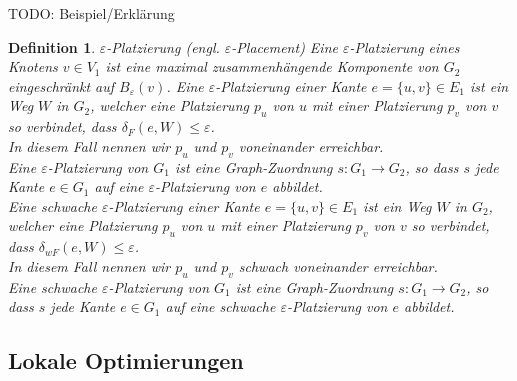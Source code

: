 \documentclass[a4paper, 12pt, twoside]{article}
\theoremstyle{Format1} %
\newtheorem{Def}{Definition}[section]       %
\begin{document}
TODO: Beispiel/Erklärung

\begin{Def}
	$\varepsilon$-Platzierung (engl. $\varepsilon$-Placement)
	Eine \textit{$\varepsilon$-Platzierung eines Knotens $v \in V_1$} ist eine maximal zusammenhängende Komponente von $G_2$ eingeschränkt auf $B_{\varepsilon}(v)$.
	Eine \textit{$\varepsilon$-Platzierung einer Kante $e = \{u,v\} \in E_1$} ist ein Weg $W$ in $G_2$, welcher eine Platzierung $p_u$ von $u$ mit einer Platzierung $p_v$ von $v$
	so verbindet, dass $\delta_F(e, W) \leq \varepsilon$.
	\\
	In diesem Fall nennen wir $p_u$ und $p_v$ \textit{voneinander erreichbar}.
	\\
	Eine \textit{$\varepsilon$-Platzierung von $G_1$} ist eine Graph-Zuordnung $s: G_1 \to G_2$, so dass $s$ jede Kante $e \in G_1$ auf eine $\varepsilon$-Platzierung von $e$ abbildet.
	\\
	Eine schwache $\varepsilon$-Platzierung einer Kante $e = \{u,v\} \in E_1$ ist ein Weg $W$ in $G_2$, welcher eine Platzierung $p_u$ von $u$ mit einer Platzierung $p_v$ von $v$
	so verbindet, dass $\delta_{wF}(e, W) \leq \varepsilon$.
	\\
	In diesem Fall nennen wir $p_u$ und $p_v$ \textit{schwach voneinander erreichbar}.
	\\
	Eine schwache \textit{$\varepsilon$-Platzierung von $G_1$} ist eine Graph-Zuordnung $s: G_1 \to G_2$, so dass $s$ jede Kante $e \in G_1$ auf eine schwache $\varepsilon$-Platzierung von $e$ abbildet.
\end{Def}

\subsection{Lokale Optimierungen}
\end{document}

